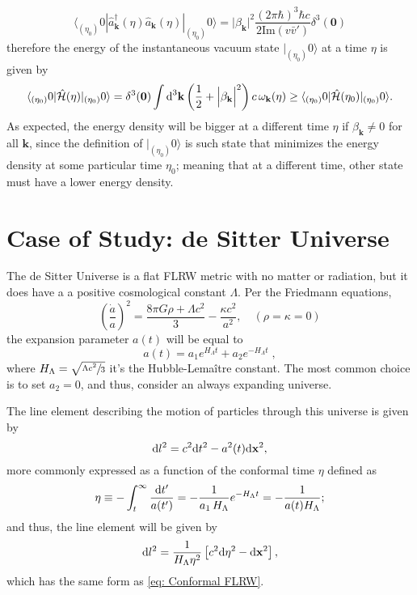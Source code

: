 \begin{equation}
	\langle_{(\eta_0)}0|\hat{a}^\dagger_\mathbf{k}(\eta)\hat{a}_\mathbf{k}(\eta)|_{(\eta_0)}0\rangle=\Big|\beta_\mathbf{k}\Big|^2\frac{(2\pi\hbar)^3\hbar c}{2\text{Im}(v\bar v')}\delta^3(\mathbf{0})
\end{equation}
therefore the energy of the instantaneous vacuum state $|_{(\eta_0)}0\rangle$ at a time $\eta$ is given by
\begin{equation}
	\langle_{(\eta_0)}0|\hat{\mathcal{H}}(\eta)|_{(\eta_0)}0\rangle=\delta^3(\mathbf{0})\int\text{d}^3\mathbf{k}\left(\frac{1}{2}+\Big|\beta_\mathbf{k}\Big|^2\right)c\,\omega_\mathbf{k}(\eta)\geq \langle_{(\eta_0)}0|\hat{\mathcal{H}}(\eta_0)|_{(\eta_0)}0\rangle.
\end{equation}
As expected, the energy density will be bigger at a different time $\eta$ if $\beta_\mathbf{k}\not=0$ for all $\mathbf{k}$, since the definition of $|_{(\eta_0)}0\rangle$ is such state that minimizes the energy density at some particular time $\eta_0$; meaning that at a different time, other state must have a lower energy density.
\section{Case of Study: de Sitter Universe}
The de Sitter Universe is a flat FLRW metric with no matter or radiation, but it does have a a positive cosmological constant $\Lambda$. Per the Friedmann equations,
\begin{equation}
	\left(\frac{\dot{a}}{a}\right)^2=\frac{8\pi G\rho+\Lambda c^2}{3}-\frac{\kappa c^2}{a^2},\quad \left(\rho=\kappa=0\right)
\end{equation}
the expansion parameter $a(t)$ will be equal to
\begin{equation}
	a(t)=a_1e^{H_\Lambda t}+a_2e^{-H_\Lambda t}\;,
\end{equation}
where $H_\Lambda=\sqrt{\sfrac{\Lambda c^2}{3}}$ it's the Hubble-Lemaître constant. The most common choice is to set $a_2=0$, and thus, consider an always expanding universe.

The line element describing the motion of particles through this universe is given by
\begin{equation}
	\text{d} l^2=c^2\text{d} t^2-a^2(t)\text{d}\mathbf{x}^2,
\end{equation}
more commonly expressed as a function of the conformal time $\eta$ defined as
\begin{equation}
	\eta\equiv -\int_t^\infty\frac{\text{d} t'}{a(t')}=-\frac{1}{a_1\,H_\Lambda}e^{-H_\Lambda t}=-\frac{1}{a(t)H_\Lambda};
\end{equation}
and thus, the line element will be given by
\begin{equation}
	\text{d} l^2= \frac{1}{H_\Lambda\eta^2}\left[c^2\text{d}\eta^2-\text{d} \mathbf{x}^2\right],
\end{equation}
which has the same form as \ref{eq: Conformal FLRW}. 

